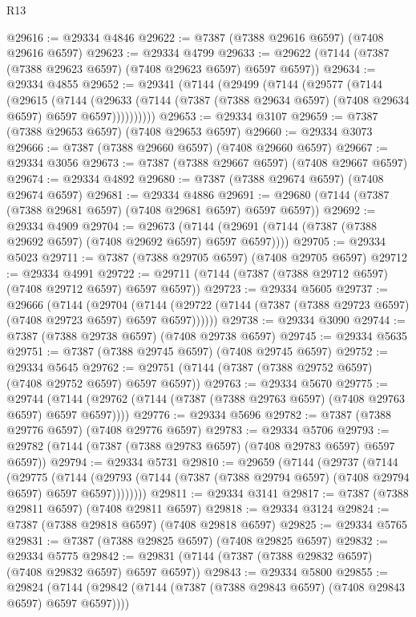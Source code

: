 \begin{lexlean}{R13}
\begin{coremodule}
@29616 := @29334 @4846
@29622 := @7387 (@7388 @29616 @6597) (@7408 @29616 @6597)
@29623 := @29334 @4799
@29633 := @29622 (@7144 (@7387 (@7388 @29623 @6597) (@7408 @29623 @6597) @6597 @6597))
@29634 := @29334 @4855
@29652 := @29341
    (@7144
      (@29499
        (@7144
          (@29577
            (@7144
              (@29615
                (@7144
                  (@29633
                    (@7144 (@7387 (@7388 @29634 @6597) (@7408 @29634 @6597) @6597 @6597))))))))))
@29653 := @29334 @3107
@29659 := @7387 (@7388 @29653 @6597) (@7408 @29653 @6597)
@29660 := @29334 @3073
@29666 := @7387 (@7388 @29660 @6597) (@7408 @29660 @6597)
@29667 := @29334 @3056
@29673 := @7387 (@7388 @29667 @6597) (@7408 @29667 @6597)
@29674 := @29334 @4892
@29680 := @7387 (@7388 @29674 @6597) (@7408 @29674 @6597)
@29681 := @29334 @4886
@29691 := @29680 (@7144 (@7387 (@7388 @29681 @6597) (@7408 @29681 @6597) @6597 @6597))
@29692 := @29334 @4909
@29704 := @29673
    (@7144 (@29691 (@7144 (@7387 (@7388 @29692 @6597) (@7408 @29692 @6597) @6597 @6597))))
@29705 := @29334 @5023
@29711 := @7387 (@7388 @29705 @6597) (@7408 @29705 @6597)
@29712 := @29334 @4991
@29722 := @29711 (@7144 (@7387 (@7388 @29712 @6597) (@7408 @29712 @6597) @6597 @6597))
@29723 := @29334 @5605
@29737 := @29666
    (@7144
      (@29704
        (@7144 (@29722 (@7144 (@7387 (@7388 @29723 @6597) (@7408 @29723 @6597) @6597 @6597))))))
@29738 := @29334 @3090
@29744 := @7387 (@7388 @29738 @6597) (@7408 @29738 @6597)
@29745 := @29334 @5635
@29751 := @7387 (@7388 @29745 @6597) (@7408 @29745 @6597)
@29752 := @29334 @5645
@29762 := @29751 (@7144 (@7387 (@7388 @29752 @6597) (@7408 @29752 @6597) @6597 @6597))
@29763 := @29334 @5670
@29775 := @29744
    (@7144 (@29762 (@7144 (@7387 (@7388 @29763 @6597) (@7408 @29763 @6597) @6597 @6597))))
@29776 := @29334 @5696
@29782 := @7387 (@7388 @29776 @6597) (@7408 @29776 @6597)
@29783 := @29334 @5706
@29793 := @29782 (@7144 (@7387 (@7388 @29783 @6597) (@7408 @29783 @6597) @6597 @6597))
@29794 := @29334 @5731
@29810 := @29659
    (@7144
      (@29737
        (@7144
          (@29775
            (@7144
              (@29793 (@7144 (@7387 (@7388 @29794 @6597) (@7408 @29794 @6597) @6597 @6597))))))))
@29811 := @29334 @3141
@29817 := @7387 (@7388 @29811 @6597) (@7408 @29811 @6597)
@29818 := @29334 @3124
@29824 := @7387 (@7388 @29818 @6597) (@7408 @29818 @6597)
@29825 := @29334 @5765
@29831 := @7387 (@7388 @29825 @6597) (@7408 @29825 @6597)
@29832 := @29334 @5775
@29842 := @29831 (@7144 (@7387 (@7388 @29832 @6597) (@7408 @29832 @6597) @6597 @6597))
@29843 := @29334 @5800
@29855 := @29824
    (@7144 (@29842 (@7144 (@7387 (@7388 @29843 @6597) (@7408 @29843 @6597) @6597 @6597))))

\end{coremodule}
\end{lexlean}
